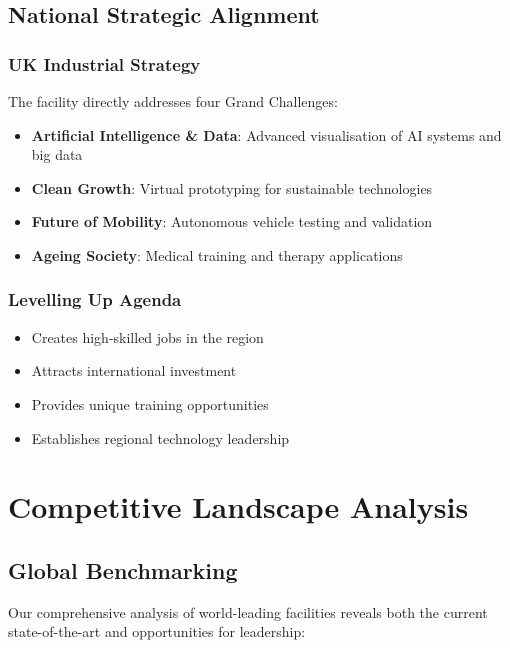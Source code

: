 \subsection{National Strategic Alignment}

\subsubsection{UK Industrial Strategy}

The facility directly addresses four Grand Challenges:

\begin{itemize}
    \item \textbf{Artificial Intelligence \& Data}: Advanced visualisation of AI systems and big data
    \item \textbf{Clean Growth}: Virtual prototyping for sustainable technologies
    \item \textbf{Future of Mobility}: Autonomous vehicle testing and validation
    \item \textbf{Ageing Society}: Medical training and therapy applications
\end{itemize}

\subsubsection{Levelling Up Agenda}

\begin{itemize}
    \item Creates high-skilled jobs in the region
    \item Attracts international investment
    \item Provides unique training opportunities
    \item Establishes regional technology leadership
\end{itemize}

\section{Competitive Landscape Analysis}

\subsection{Global Benchmarking}

Our comprehensive analysis of world-leading facilities reveals both the current state-of-the-art and opportunities for leadership:

